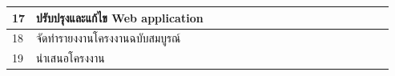 \documentclass[12pt,oneside,openright,a4paper]{cpe-thai-project}
\begin{document}
\begin{table}[]
{\begin{tabular}{|llllllllllllllllll|}
\multicolumn{1}{|l|}{17}                    & \multicolumn{1}{l|}{ปรับปรุงและแก้ไข Web application}                                     & \multicolumn{1}{l|}{\cellcolor[HTML]{2D8C9F}} & \multicolumn{1}{l|}{\cellcolor[HTML]{2D8C9F}} & \multicolumn{1}{l|}{\cellcolor[HTML]{2D8C9F}} & \multicolumn{1}{l|}{\cellcolor[HTML]{2D8C9F}} & \multicolumn{1}{l|}{\cellcolor[HTML]{2D8C9F}} & \multicolumn{1}{l|}{\cellcolor[HTML]{2D8C9F}} & \multicolumn{1}{l|}{\cellcolor[HTML]{2D8C9F}} & \multicolumn{1}{l|}{\cellcolor[HTML]{2D8C9F}} & \multicolumn{1}{l|}{\cellcolor[HTML]{2D8C9F}} & \multicolumn{1}{l|}{\cellcolor[HTML]{2D8C9F}} & \multicolumn{1}{l|}{\cellcolor[HTML]{2D8C9F}} & \multicolumn{1}{l|}{\cellcolor[HTML]{2D8C9F}} & \multicolumn{1}{l|}{\cellcolor[HTML]{2D8C9F}} & \multicolumn{1}{l|}{\cellcolor[HTML]{2D8C9F}} & \multicolumn{1}{l|}{\cellcolor[HTML]{2D8C9F}} & \cellcolor[HTML]{2D8C9F} \\ \hline
\multicolumn{1}{|l|}{18}                    & \multicolumn{1}{l|}{จัดทำรายงงานโครงงานฉบับสมบูรณ์}                                       & \multicolumn{1}{l|}{}                         & \multicolumn{1}{l|}{}                         & \multicolumn{1}{l|}{}                         & \multicolumn{1}{l|}{}                         & \multicolumn{1}{l|}{}                         & \multicolumn{1}{l|}{}                         & \multicolumn{1}{l|}{}                         & \multicolumn{1}{l|}{}                         & \multicolumn{1}{l|}{\cellcolor[HTML]{2D8C9F}} & \multicolumn{1}{l|}{\cellcolor[HTML]{2D8C9F}} & \multicolumn{1}{l|}{\cellcolor[HTML]{2D8C9F}} & \multicolumn{1}{l|}{\cellcolor[HTML]{2D8C9F}} & \multicolumn{1}{l|}{\cellcolor[HTML]{2D8C9F}} & \multicolumn{1}{l|}{\cellcolor[HTML]{2D8C9F}} & \multicolumn{1}{l|}{\cellcolor[HTML]{2D8C9F}} & \cellcolor[HTML]{2D8C9F} \\ \hline
\multicolumn{1}{|l|}{19}                    & \multicolumn{1}{l|}{นำเสนอโครงงาน}                                                        & \multicolumn{1}{l|}{}                         & \multicolumn{1}{l|}{}                         & \multicolumn{1}{l|}{}                         & \multicolumn{1}{l|}{}                         & \multicolumn{1}{l|}{}                         & \multicolumn{1}{l|}{}                         & \multicolumn{1}{l|}{}                         & \multicolumn{1}{l|}{}                         & \multicolumn{1}{l|}{}                         & \multicolumn{1}{l|}{}                         & \multicolumn{1}{l|}{}                         & \multicolumn{1}{l|}{}                         & \multicolumn{1}{l|}{}                         & \multicolumn{1}{l|}{}                         & \multicolumn{1}{l|}{}                         & \cellcolor[HTML]{2D8C9F} \\ \hline
\end{tabular}%
}
\end{table}
\end{document}
